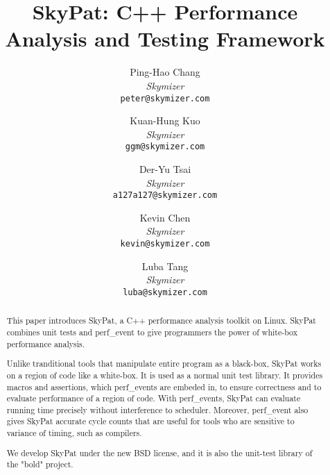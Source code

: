 \documentclass[final]{ols}
\begin{document}
\title{SkyPat: C++ Performance Analysis and Testing Framework}
\subtitle{}

\author{
	Ping-Hao Chang \\
	{\em Skymizer}\\
	{\tt\small peter@skymizer.com}\\
\and
	Kuan-Hung Kuo\\
	{\em Skymizer}\\
	{\tt\small ggm@skymizer.com}\\
\and
	Der-Yu Tsai\\
	{\em Skymizer}\\
	{\tt\small a127a127@skymizer.com}\\
\and
	Kevin Chen\\
	{\em Skymizer}\\
	{\tt\small kevin@skymizer.com}
\and
	Luba Tang\\
	{\em Skymizer}\\
	{\tt\small luba@skymizer.com}\\
}

\date{} %

\maketitle


\begin{abstract}
This paper introduces SkyPat, a C++ performance analysis toolkit on Linux.
SkyPat combines unit tests and perf\_event to give programmers the power of white-box performance analysis.

Unlike tranditional tools that manipulate entire program as a black-box, SkyPat works on a region of code like a white-box.
It is used as a normal unit test library.
It provides macros and assertions, which perf\_events are embeded in, to ensure correctness and to evaluate performance of a region of code.
With perf\_events, SkyPat can evaluate running time precisely without interference to scheduler.
Moreover, perf\_event also gives SkyPat accurate cycle counts that are useful for tools who are sensitive to variance of timing, such as compilers.

We develop SkyPat under the new BSD license, and it is also the unit-test library of the "bold" project.
\end{abstract}
\end{document}
